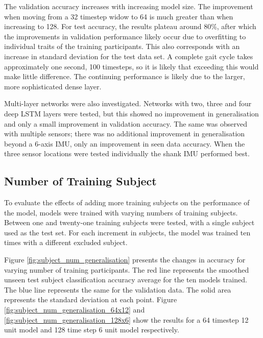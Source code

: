 \documentclass[sensors,article,submit,moreauthors,pdftex]{Definitions/mdpi}
\begin{document}
The validation accuracy increases with increasing model size. The improvement when moving from a 32 timestep widow to 64 is much greater than when increasing to 128. For test accuracy, the results plateau around 80\%, after which the improvements in validation performance likely occur due to overfitting to individual traits of the training participants. This also corresponds with an increase in standard deviation for the test data set. A complete gait cycle takes approximately one second, 100 timesteps, so it is likely that exceeding this would make little difference. The continuing performance is likely due to the larger, more sophisticated dense layer.

Multi-layer networks were also investigated. Networks with two, three and four deep LSTM layers were tested, but this showed no improvement in generalisation and only a small improvement in validation accuracy. The same was observed with multiple sensors; there was no additional improvement in generalisation beyond a 6-axis IMU, only an improvement in seen data accuracy. When the three sensor locations were tested individually the shank IMU performed best.

\subsection{Number of Training Subject}
To evaluate the effects of adding more training subjects on the performance of the model, models were trained with varying numbers of training subjects. Between one and twenty-one training subjects were tested, with a single subject used as the test set. For each increment in subjects, the model was trained ten times with a different excluded subject.

Figure \ref{fig:subject_num_generalisation} presents the changes in accuracy for varying number of training participants. The red line represents the smoothed unseen test subject classification accuracy average for the ten models trained. The blue line represents the same for the validation data. The solid area represents the standard deviation at each point. Figure \ref{fig:subject_num_generalisation_64x12} and \ref{fig:subject_num_generalisation_128x6} show the results for a 64 timestep 12 unit model and 128 time step 6 unit model respectively.
\end{document}
